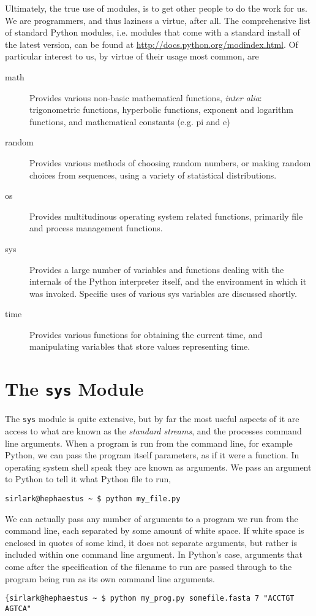 Ultimately, the true use of modules, is to get other people to do   the work for us. We are programmers, and thus laziness a virtue, after   all. The comprehensive list of standard Python modules, i.e. modules   that come with a standard install of the latest version, can be found at \href{http://docs.python.org/modindex.html}{http://docs.python.org/modindex.html}. Of particular   interest to us, by virtue of their usage most common, are
\begin{description}
	\item[math] Provides various non-basic mathematical functions, \textit{inter    alia}: trigonometric functions, hyperbolic functions, exponent    and logarithm functions, and mathematical constants (e.g. pi and    e)
	\item[random] Provides various methods of choosing random numbers, or making    random choices from sequences, using a variety of statistical    distributions.
	\item[os] Provides multitudinous operating system related functions,    primarily file and process management functions.
	\item[sys] Provides a large number of variables and functions dealing with    the internals of the Python interpreter itself, and the environment    in which it was invoked. Specific uses of various sys variables are    discussed shortly.
	\item[time] Provides various functions for obtaining the current time, and    manipulating variables that store values representing time.
\end{description}

\section{The \texttt{sys} Module}

The \texttt{sys} module is quite extensive, but by far the most useful   aspects of it are access to what are known as the \textit{standard   streams}, and the processes command line arguments. When a   program is run from the command line, for example Python, we can pass   the program itself parameters, as if it were a function. In operating   system shell speak they are known as arguments. We pass an argument to   Python to tell it what Python file to run,
\begin{lstlisting}
sirlark@hephaestus ~ $ python my_file.py
\end{lstlisting}

We can actually pass any number of arguments to a program we run   from the command line, each separated by some amount of white space. If   white space is enclosed in quotes of some kind, it does not separate   arguments, but rather is included within one command line argument. In   Python's case, arguments that come after the specification of the   filename to run are passed through to the program being run as its own   command line arguments.    
\begin{lstlisting}
{sirlark@hephaestus ~ $ python my_prog.py somefile.fasta 7 "ACCTGT AGTCA"
\end{lstlisting}

